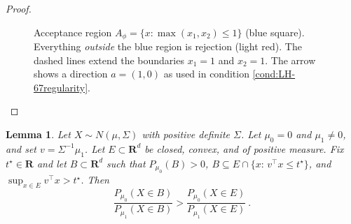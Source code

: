 \documentclass[12pt]{article}
\newtheorem{lemma}{Lemma}
\theoremstyle{definition}
\theoremstyle{remark}
\begin{document}
\begin{proof}
\begin{figure}[h!]
\caption{Acceptance region $A_\phi=\{x:\max(x_1,x_2)\le 1\}$ (blue square). 
Everything \emph{outside} the blue region is rejection (light red). 
The dashed lines extend the boundaries $x_1=1$ and $x_2=1$. 
The arrow shows a direction $a=(1,0)$ as used in condition \eqref{cond:LH-67regularity}.}\label{fig:ray}
\end{figure}


\end{proof}


\begin{lemma}\label{lem:odd-ratio}
Let $X\sim N(\mu,\Sigma)$ with positive definite $\Sigma$. Let $\mu_0=0$ and $\mu_1\ne 0$, and set $v=\Sigma^{-1}\mu_1$. 
Let $E\subset\mathbf{R}^d$ be closed, convex, and of positive measure. Fix $t^\star\in\mathbf{R}$ and let $B\subset\mathbf{R}^d$ such that $P_{\mu_0}(B)>0$, $B \subseteq E\cap\{x:\, v^\top x \le t^\star\}$, and $\sup_{x\in E} v^\top x > t^\star$. Then
\[
\frac{P_{\mu_0}(X\in B)}{P_{\mu_1}(X\in B)} > \frac{P_{\mu_0}(X\in E)}{P_{\mu_1}(X\in E)}~.
\]
\end{lemma}
\end{document}
